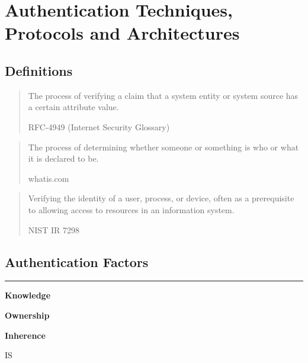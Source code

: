 \chapter{Authentication Techniques, Protocols and Architectures}

\section*{Definitions}

\blockquote[RFC-4949 (Internet Security Glossary)]{
    The process of verifying a claim that a system entity or system source has a certain attribute value.
}

\vspace{0.3cm}

\blockquote[whatis.com]{The process of determining whether someone or something is who or what it is declared to be.}

\vspace{0.3cm}

\blockquote[NIST IR 7298]{Verifying the identity of a user, process, or device, often as a prerequisite to allowing access to resources in an information system.} 

\section{Authentication Factors}

\vspace{0.3cm}

\hrule


\begin{multicols}{3}
    \begin{center}
        \large{\textbf{Knowledge}}
    \end{center}
    
    \columnbreak
    \columnseprule=0.5pt

    \begin{center}
        \large{\textbf{Ownership}}
    \end{center}
    \columnbreak

    \begin{center}
        \large{\textbf{Inherence}}
    \end{center}
\end{multicols}

\begin{center}
     IS 
\end{center}

